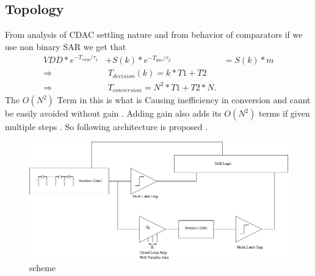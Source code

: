 \documentclass[a4paper,10pt,fleqn,titlepage,twoside]{article}
\begin{document}
\subsection*{Topology}
From analysis of CDAC settling nature and from behavior of comparators if we use non binary SAR we get that 
\begin{align*}
VDD*e^{-T_{cmp}/\tau_1}&+S(k)*e^{-T_{dac}/\tau_2} &= S(k)*m\\
\Rightarrow &\;T_{decision}(k) = k*T1+T2\\
\Rightarrow &\;T_{conversion} = N^2*T1+T2*N.
\end{align*}
The $O(N^{2})$ Term in this is what is Causing inefficiency in conversion and cannt be easily avoided without gain . 
Adding gain also adds its $O(N^2)$ terms if given multiple steps . So following architecture is proposed .
\begin{figure}[h]
\centering
\includegraphics[width=1.0\linewidth]{./img/topArch.png}
\caption{scheme}
\label{fig:topArch}
\end{figure}
\end{document}
